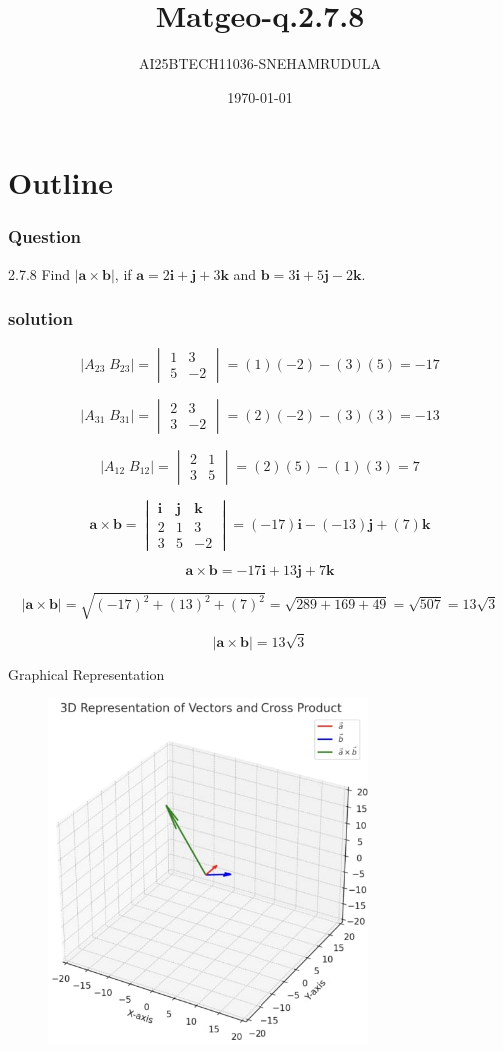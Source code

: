 \documentclass{beamer}
\title{Matgeo-q.2.7.8}
\author{AI25BTECH11036-SNEHAMRUDULA}
\date{\today}
\theoremstyle{remark}
\let\vec\mathbf
\begin{document}
\begin{frame}
\titlepage
\end{frame}

\section*{Outline}


\begin{frame}
\frametitle{Question}
2.7.8 Find $|\vec{a} \times \vec{b}|$, if 
$\vec{a} = 2\mathbf{i} + \mathbf{j} + 3\mathbf{k}$ and 
$\vec{b} = 3\mathbf{i} + 5\mathbf{j} - 2\mathbf{k}$.
\end{frame}
\begin{frame}
\frametitle{solution}

\[
|A_{23} \; B_{23}| = 
\begin{vmatrix}
1 & 3 \\
5 & -2
\end{vmatrix}
= (1)(-2) - (3)(5) = -17 \tag{2.7.8.1}
\]

\[
|A_{31} \; B_{31}| = 
\begin{vmatrix}
2 & 3 \\
3 & -2
\end{vmatrix}
= (2)(-2) - (3)(3) = -13 \tag{2.7.8.2}
\]

\[
|A_{12} \; B_{12}| = 
\begin{vmatrix}
2 & 1 \\
3 & 5
\end{vmatrix}
= (2)(5) - (1)(3) = 7 \tag{2.7.8.3}
\]

\[
\vec{a} \times \vec{b} =
\begin{vmatrix}
\mathbf{i} & \mathbf{j} & \mathbf{k} \\
2 & 1 & 3 \\
3 & 5 & -2
\end{vmatrix}
= (-17)\mathbf{i} - (-13)\mathbf{j} + (7)\mathbf{k} \tag{2.7.8.4}
\]

\[
\vec{a} \times \vec{b} = -17\mathbf{i} + 13\mathbf{j} + 7\mathbf{k}
\]

\[
|\vec{a} \times \vec{b}| = 
\sqrt{(-17)^2 + (13)^2 + (7)^2} 
= \sqrt{289 + 169 + 49} 
= \sqrt{507} 
= 13\sqrt{3} 
\]

\[
\boxed{|\vec{a} \times \vec{b}| = 13\sqrt{3}}
\]

\end{frame}
    \begin{frame}{Graphical Representation}
   \begin{figure}[h!]
\centering
\includegraphics[width=0.5\linewidth]{fig2.7.8}

\end{figure}
\end{frame}
\end{document}
